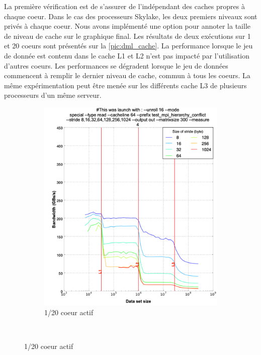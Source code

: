         La première vérification est de s'assurer de l'indépendant des caches propres à chaque coeur. Dans le cas des processeurs Skylake, les deux premiers niveaux sont privés à chaque coeur. Nous avons implémenté une option pour annoter la taille de niveau de cache sur le graphique final. Les résultats de deux exécutions sur 1 et 20 coeurs sont présentés sur la \autoref{pic:dml_cache}. La performance lorsque le jeu de donnée est contenu dans le cache L1 et L2 n'est pas impacté par l'utilisation d'autres coeurs. Les performances se dégradent lorsque le jeu de données commencent à remplir le dernier niveau de cache, commun à tous les coeurs. La même expérimentation peut être menée sur les différents cache L3 de plusieurs processeurs d'un même serveur.
        
        \begin{figure}
        \centering
            \begin{subfigure}[b]{0.47\linewidth}
            \includegraphics[width=\linewidth]{images/dml_cache_1core.png}
            \caption{1/20 coeur actif}
            \label{pic:dml_cache_1core}
            \end{subfigure}
        ~ %

\end{figure}
